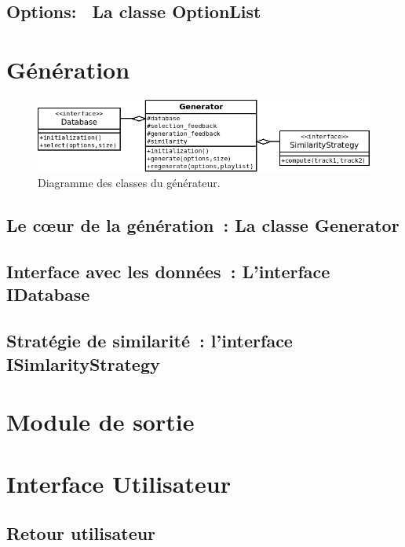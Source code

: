 \subsection{Options:~ La classe OptionList}
\label{archi:communication:options}

\section{Génération}
\label{archi:generation}

\begin{figure}[H]
\includegraphics[width=\textwidth]{data/archi/generator.png}
\caption{Diagramme des classes du générateur.}
\end{figure}

\subsection{Le cœur de la génération~: La classe Generator}
\label{archi:generation:generator}

\subsection{Interface avec les données~: L'interface IDatabase}
\label{archi:generation:database}

\subsection{Stratégie de similarité~: l'interface ISimlarityStrategy}
\label{archi:generation:similarity}

\section{Module de sortie}
\label{archi:sortie}

\section{Interface Utilisateur}
\label{archi:interface}

\subsection{Retour utilisateur}
\label{archi:interface:feedback}

